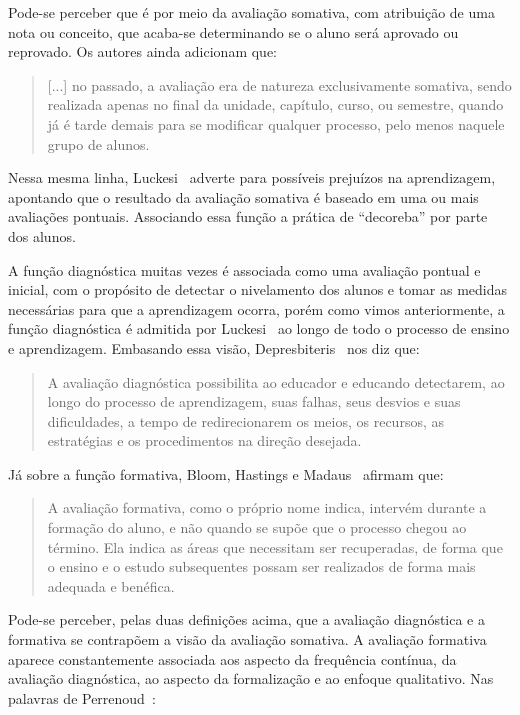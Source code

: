Pode-se perceber que é por meio da avaliação somativa, com atribuição de uma nota ou conceito, que acaba-se determinando se o aluno será aprovado ou reprovado. Os autores ainda adicionam que:

\begin{quote}
[...] no passado, a avaliação era de natureza exclusivamente somativa, sendo realizada apenas no final da unidade, capítulo, curso, ou semestre, quando já é tarde demais para se modificar qualquer processo, pelo menos naquele grupo de alunos.~\cite{bloom1983manual}
\end{quote}

Nessa mesma linha, Luckesi~\cite{luckesi2014avaliaccao} adverte para possíveis prejuízos na aprendizagem, apontando que o resultado da avaliação somativa é baseado em uma ou mais avaliações pontuais. Associando essa função a prática de ``decoreba'' por parte dos alunos.

A função diagnóstica muitas vezes é associada como uma avaliação pontual e inicial, com o propósito de detectar o nivelamento dos alunos e tomar as medidas necessárias para que a aprendizagem ocorra, porém como vimos anteriormente, a função diagnóstica é admitida por Luckesi~\cite{luckesi2014avaliaccao} ao longo de todo o processo de ensino e aprendizagem. Embasando essa visão, Depresbiteris~\cite{depresbiteris2017diversificar} nos diz que:

\begin{quote}
A avaliação diagnóstica possibilita ao educador e educando detectarem, ao longo do processo de aprendizagem, suas falhas, seus desvios e suas dificuldades, a tempo de redirecionarem os meios, os recursos, as estratégias e os procedimentos na direção desejada.~\cite{depresbiteris2017diversificar} 
\end{quote}

Já sobre a função formativa, Bloom, Hastings e Madaus~\cite{bloom1983manual} afirmam que: 

\begin{quote}
A avaliação formativa, como o próprio nome indica, intervém durante a formação do aluno, e não quando se supõe que o processo chegou ao término. Ela indica as áreas que necessitam ser recuperadas, de forma que o ensino e o estudo subsequentes possam ser realizados de forma mais adequada e benéfica.~\cite{bloom1983manual}
\end{quote}

Pode-se perceber, pelas duas definições acima, que a avaliação diagnóstica e a formativa se contrapõem a visão da avaliação somativa. A avaliação formativa aparece constantemente associada aos aspecto da frequência contínua, da avaliação diagnóstica, ao aspecto da formalização e ao enfoque qualitativo. Nas palavras de Perrenoud~\cite{perrenoud@93}:

